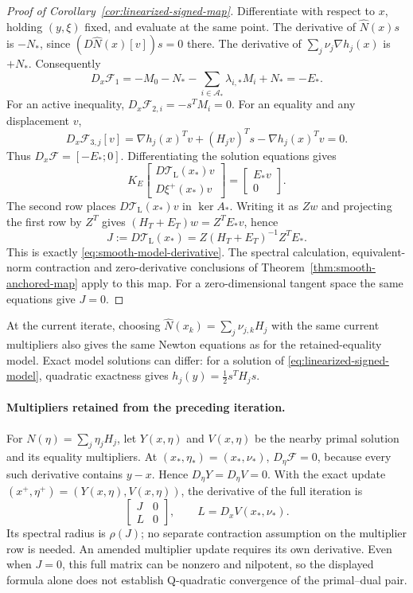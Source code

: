 \documentclass[pdflatex,sn-mathphys-num]{sn-jnl}
\theoremstyle{thmstyleone}
\theoremstyle{thmstylethree}
\begin{document}
\begin{proof}[Proof of Corollary~\ref{cor:linearized-signed-map}]
Differentiate with respect to $x$, holding $(y,\xi)$ fixed, and evaluate
at the same point. The derivative of
$\widehat N(x)s$ is $-N_*$, since
$(D\widehat N(x)[v])s=0$ there. The derivative of
$\sum_j\nu_j\nabla h_j(x)$ is $+N_*$. Consequently
\[
 D_x\mathcal F_1
 =-M_0-N_*-\sum_{i\in\mathcal A_*}\lambda_{i,*}M_i+N_*
 =-E_*.
\]
For an active inequality, $D_x\mathcal F_{2,i}=-s^TM_i=0$.
For an equality and any displacement $v$,
\[
 D_x\mathcal F_{3,j}[v]
 =\nabla h_j(x)^Tv+(H_jv)^Ts-\nabla h_j(x)^Tv=0.
\]
Thus $D_x\mathcal F=[-E_*;0]$. Differentiating the solution equations
gives
\[
 K_E
 \begin{bmatrix}D\mathcal T_{\mathrm L}(x_*)v\\D\xi^+(x_*)v\end{bmatrix}
 =\begin{bmatrix}E_*v\\0\end{bmatrix}.
\]
The second row places $D\mathcal T_{\mathrm L}(x_*)v$ in
$\ker A_*$. Writing it as $Zw$ and projecting the first row by $Z^T$
gives $(H_T+E_T)w=Z^TE_*v$, hence
\[
 J:=D\mathcal T_{\mathrm L}(x_*)
   =Z(H_T+E_T)^{-1}Z^TE_*.
\]
This is exactly \eqref{eq:smooth-model-derivative}. The spectral
calculation, equivalent-norm contraction and zero-derivative
conclusions of Theorem~\ref{thm:smooth-anchored-map} apply to this map.
For a zero-dimensional tangent space the same equations give $J=0$.
\end{proof}

At the current iterate, choosing
$\widehat N(x_k)=\sum_j\nu_{j,k}H_j$ with the same current multipliers
also gives the same Newton equations as for the retained-equality model.
Exact model solutions can differ: for a solution of
\eqref{eq:linearized-signed-model}, quadratic exactness gives
$h_j(y)=\tfrac12s^TH_js$.

\paragraph{Multipliers retained from the preceding iteration.}
For $N(\eta)=\sum_j\eta_jH_j$, let $Y(x,\eta)$ and $V(x,\eta)$ be
the nearby primal solution and its equality multipliers. At
$(x_*,\eta_*)=(x_*,\nu_*)$, $D_\eta\mathcal F=0$, because every
such derivative contains $y-x$. Hence $D_\eta Y=D_\eta V=0$.
With the exact update $(x^+,\eta^+)=(Y(x,\eta),V(x,\eta))$,
the derivative of the full iteration is
\[
 \begin{bmatrix}J&0\\L&0\end{bmatrix},
 \qquad L=D_xV(x_*,\nu_*).
\]
Its spectral radius is $\rho(J)$; no separate contraction assumption
on the multiplier row is needed. An amended multiplier update requires
its own derivative. Even when $J=0$, this full matrix can be nonzero
and nilpotent, so the displayed formula alone does not establish
Q-quadratic convergence of the primal--dual pair.
\end{document}

